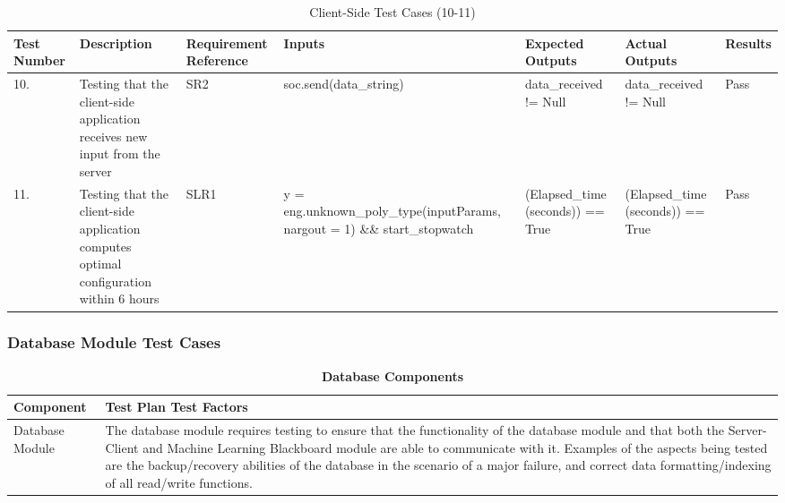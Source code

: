 \documentclass[12pt, titlepage]{article}
\begin{document}
\begin{center}
    \begin{table}[H]
        \centering
        \begin{tabular}{|p{1cm}|p{2.2cm}|p{2.5cm}|p{2.7cm}|p{2.4cm}|p{2.4cm}|p{1.3cm}|}
        \hline
        \bf Test Number & \bf Description & \bf Requirement Reference & \bf Inputs & \bf Expected Outputs & \bf Actual Outputs & \bf Results \\
        \hline
        10. & Testing that the client-side application receives new input from the server & SR2 & soc.\newline send(data\_string) & data\_received != Null & data\_received != Null & Pass\\
        \hline
        11. & Testing that the client-side application computes optimal configuration within 6 hours & SLR1 & y = eng.unknown\_\newline poly\_type\newline (inputParams, nargout = 1) \&\& start_stopwatch & (Elapsed\_time \leq 21600 \newline (seconds)) == True & (Elapsed\_time \leq 21600 \newline (seconds)) == True & Pass\\
        \hline
        \end{tabular}
        \caption{Client-Side Test Cases (10-11)}
        \label{tab:my_label10}
    \end{table}
\end{center}

\subsubsection{Database Module Test Cases}
\begin{center}
\begin{table}[H]
\centering
\begin{tabular}{ |p{5cm}|p{10cm}|  } 
 \hline
\bf Component & \bf Test Plan Test Factors\\
\hline
 Database Module & The database module requires testing to ensure that the functionality of the database module and that both the Server-Client and Machine Learning Blackboard module are able to communicate with it. Examples of the aspects being tested are the backup/recovery abilities of the database in the scenario of a major failure, and correct data formatting/indexing of all read/write functions.\\
 \hline
\end{tabular}
\caption{\bf Database Components}
\label{tab:my_label11}
\end{table}
\end{center}
\end{document}
